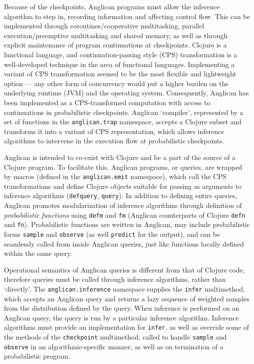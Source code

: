 \documentclass[a4paper]{article}
\begin{document}
Because of the checkpoints, Anglican programs must allow the
inference algorithm to step in, recording information and
affecting control flow. This can be implemented through
coroutines/cooperative multitasking, parallel execution/preemptive
multitasking and shared memory, as well as through explicit
maintenance of program continuations at checkpoints. Clojure is
a functional language, and continuation-passing style (CPS)
transformation is a well-developed technique in the area of
functional languages. Implementing a variant of CPS
transformation seemed to be the most flexible and lightweight
option --- any other form of concurrency would put a higher burden
on the underlying runtime (JVM) and the operating system.
Consequently, Anglican has been implemented as a CPS-transformed
computation with access to continuations in probabilistic
checkpoints. Anglican `compiler', represented by a set of
functions in the \texttt{anglican.trap} namespace, accepts a
Clojure subset and transforms it into a variant of CPS
representation, which allows inference algorithms to intervene
in the execution flow at probabilistic checkpoints.

Anglican is intended to co-exist with Clojure and be a part of
the source of a Clojure program. To facilitate this, Anglican
programs, or queries, are wrapped by macros (defined in the
\texttt{anglican.emit} namespace), which call the CPS
transformations and define Clojure objects suitable for passing
as arguments to inference algorithms (\texttt{defquery},
\texttt{query}). In addition to defining entire queries,
Anglican promotes modularization of inference algorithms through
definition of \textit{probabilistic functions} using
\texttt{defm} and \texttt{fm} (Anglican counterparts of Clojure
\texttt{defn} and \texttt{fn}). Probabilistic functions are
written in Anglican, may include probabilistic forms
\texttt{sample} and \texttt{observe} (as well \texttt{predict}
for the output), and can be seamlessly called from inside
Anglican queries, just like functions locally defined within the
same query.

Operational semantics of Anglican queries is different from that
of Clojure code, therefore queries must be called through
inference algorithms, rather than `directly'.  The
\texttt{anglican.inference} namespace supplies the
\texttt{infer} multimethod, which accepts an Anglican query and
returns a lazy sequence of weighted samples from the
distribution defined by the query.  When inference
is performed on an Anglican query, the query is run by a
particular inference algorithm. Inference algorithms must
provide an implementation for \texttt{infer}, as well as
override some of the methods of the \texttt{checkpoint}
multimethod, called to handle \texttt{sample} and
\texttt{observe} in an algorithmic-specific manner, as well
as on termination of a probabilistic program.
\end{document}
